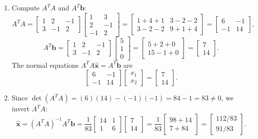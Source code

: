 \documentclass[11pt, letterpaper]{article}
\theoremstyle{definition}
\theoremstyle{remark}
\begin{document}
\begin{enumerate}[label=(\alph*)]
    \item Compute $A^T A$ and $A^T \mathbf{b}$:
    \[
    A^T A = \begin{bmatrix} 1 & 2 & -1 \\ 3 & -1 & 2 \end{bmatrix} \begin{bmatrix} 1 & 3 \\ 2 & -1 \\ -1 & 2 \end{bmatrix} = \begin{bmatrix} 1+4+1 & 3-2-2 \\ 3-2-2 & 9+1+4 \end{bmatrix} = \begin{bmatrix} 6 & -1 \\ -1 & 14 \end{bmatrix},
    \]
    \[
    A^T \mathbf{b} = \begin{bmatrix} 1 & 2 & -1 \\ 3 & -1 & 2 \end{bmatrix} \begin{bmatrix} 5 \\ 1 \\ 0 \end{bmatrix} = \begin{bmatrix} 5+2+0 \\ 15-1+0 \end{bmatrix} = \begin{bmatrix} 7 \\ 14 \end{bmatrix}.
    \]
    The normal equations $A^T A \hat{\mathbf{x}} = A^T \mathbf{b}$ are
    \[
    \begin{bmatrix} 6 & -1 \\ -1 & 14 \end{bmatrix} \begin{bmatrix} x_1 \\ x_2 \end{bmatrix} = \begin{bmatrix} 7 \\ 14 \end{bmatrix}.
    \]
    \item Since $\det(A^T A) = (6)(14) - (-1)(-1) = 84 - 1 = 83 \neq 0$, we invert $A^T A$:
    \[
    \hat{\mathbf{x}} = (A^T A)^{-1} A^T \mathbf{b} = \frac{1}{83} \begin{bmatrix} 14 & 1 \\ 1 & 6 \end{bmatrix} \begin{bmatrix} 7 \\ 14 \end{bmatrix} = \frac{1}{83} \begin{bmatrix} 98 + 14 \\ 7 + 84 \end{bmatrix} = \begin{bmatrix} 112/83 \\ 91/83 \end{bmatrix}.
    \]
\end{enumerate}
\end{document}
